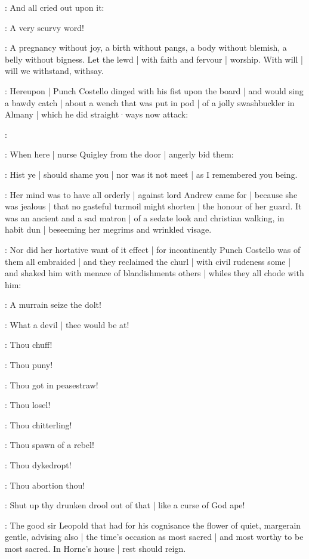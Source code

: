 :
And all cried out upon it:

\All:
A very scurvy word!

\stephen:
A pregnancy without joy,
a birth without pangs,
a body without blemish,
a belly without bigness.
Let the lewd |
with faith and fervour |
worship.
With will |
will we withstand,
withsay.


:
Hereupon |
Punch Costello dinged with his fist upon the board |
and would sing a bawdy catch  |
about a wench that was put in pod |
of a jolly swashbuckler in Almany |
which he did straight·ways now attack:

\punch:

:
When here |
nurse Quigley from the door |
angerly bid them:

\nursequigley:
Hist ye |
should shame you |
nor was it not meet |
as I remembered you being.

:
Her mind was to have all orderly |
against lord Andrew came for |
because she was jealous |
that no gasteful turmoil might shorten |
the honour of her guard.
It was an ancient and a sad matron |
of a sedate look and christian walking,
in habit dun |
beseeming her megrims and wrinkled visage.

:
Nor did her hortative want of it effect |
for incontinently Punch Costello was of them all embraided |
and they reclaimed the churl |
with civil rudeness some |
and shaked him with menace of blandishments others |
whiles they all chode with him:

\lynch:
A murrain seize the dolt!

\madden:
What a devil |
thee would be at!

\crotthers:
Thou chuff!

\dixon:
Thou puny!

\lenehan:
Thou got in peasestraw!

\lynch:
Thou losel!

\madden:
Thou chitterling!

\crotthers:
Thou spawn of a rebel!

\lenehan:
Thou dykedropt!

\dixon:
Thou abortion thou!

\stephen:
Shut up thy drunken drool out of that |
like a curse of God ape!

:
The good sir Leopold
that had for his cognisance
the flower of quiet,
margerain gentle,
advising also |
the time's occasion as most sacred |
and most worthy to be most sacred.
In Horne's house |
rest should reign.

